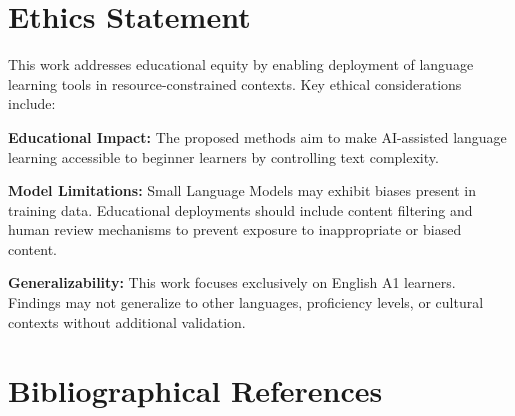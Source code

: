 \documentclass[10pt, a4paper]{article}
\begin{document}
\section{Ethics Statement}

This work addresses educational equity by enabling deployment of language learning tools in resource-constrained contexts. Key ethical considerations include:

\textbf{Educational Impact:} The proposed methods aim to make AI-assisted language learning accessible to beginner learners by controlling text complexity.

\textbf{Model Limitations:} Small Language Models may exhibit biases present in training data. Educational deployments should include content filtering and human review mechanisms to prevent exposure to inappropriate or biased content.

\textbf{Generalizability:} This work focuses exclusively on English A1 learners. Findings may not generalize to other languages, proficiency levels, or cultural contexts without additional validation.

\section{Bibliographical References}


\end{document}

